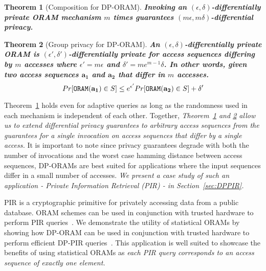 \documentclass[USenglish,oneside,twocolumn]{article}
\newtheorem{theorem}{Theorem}
\begin{document}
\begin{theorem}[Composition for DP-ORAM]\label{thm:composability}
\textbf{Invoking an $(\epsilon, \delta)$-differentially private ORAM mechanism $m$ times guarantees $(m\epsilon, m\delta)$-differential privacy.}
\end{theorem}



\begin{theorem}[Group privacy for DP-ORAM]\label{thm:groupprivacy}
\textbf{An $(\epsilon, \delta)$-differentially private ORAM is $(\epsilon', \delta')$-differentially private for access sequences differing by $m$ accesses where $\epsilon' = m \epsilon$ and $\delta' =  m e^{m-1} \delta$. In other words, given two access sequences $\mathbf{a_1}$ and $\mathbf{a_2}$ that differ in $m$ accesses.
\begin{equation}\label{eqn:DPoramgroupprivacy}
Pr[{\tt ORAM(\mathbf{a_1})} \in S] \leq e^{\epsilon'} Pr[{\tt ORAM(\mathbf{a_2})} \in S] + \delta'
\end{equation}}
\end{theorem}


Theorem~\ref{thm:composability} holds even for adaptive queries as long as the randomness used in each mechanism is independent of each other. Together, \textit{Theorem~\ref{thm:composability} and \ref{thm:groupprivacy} allow us to extend differential privacy guarantees to arbitrary access sequences from the guarantees for a single invocation on access sequences that differ by a single access.} It is important to note since privacy guarantees degrade with both the number of invocations and the worst case hamming distance between access sequences, DP-ORAMs are best suited for applications where the input sequences differ 
in a small number of accesses. \textit{We present a case study of such an application - Private Information Retrieval (PIR) - in 
Section~\ref{sec:DPPIR}.}

PIR is a cryptographic primitive for privately accessing data from a public database. 
ORAM schemes can be used in conjunction with trusted hardware to perform 
PIR queries~\cite{williams2008usable, backes2012obliviad}.
We demonstrate the utility of statistical ORAMs by showing how DP-ORAM can be used in 
conjunction with trusted hardware to perform efficient DP-PIR queries~\cite{goldbergDPPIR}. 
This application is well suited to showcase the benefits of using statistical ORAMs as 
\textit{each PIR query corresponds to an access sequence of exactly one element.}
\end{document}
